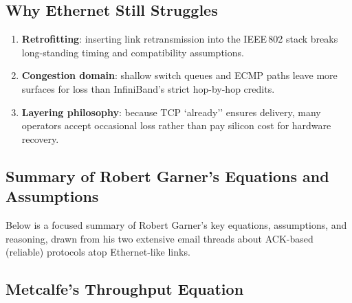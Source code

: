 \documentclass[../../../OAE-SPEC-MAIN.tex]{subfiles}
\begin{document}

\subsection{Why Ethernet Still Struggles}

\begin{enumerate}
\item \textbf{Retrofitting}: inserting link retransmission into the IEEE\,802
      stack breaks long-standing timing and compatibility assumptions.
\item \textbf{Congestion domain}: shallow switch queues and ECMP paths leave
      more surfaces for loss than InfiniBand’s strict hop-by-hop credits.
\item \textbf{Layering philosophy}: because TCP `already'' ensures delivery,
      many operators accept occasional loss rather than pay silicon cost for
      hardware recovery.
\end{enumerate}


\subsection{Summary of Robert Garner’s Equations and Assumptions}

Below is a focused summary of Robert Garner’s key equations, assumptions, and reasoning, drawn from his two extensive email threads about ACK-based (reliable) protocols atop Ethernet-like links.


\subsection{Metcalfe’s Throughput Equation}
\end{document}
